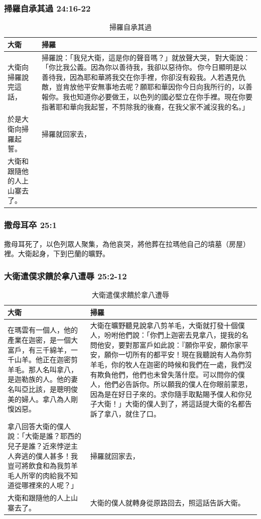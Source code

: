 \subsubsection{掃羅自承其過 24:16-22}
\begin{table}[H]
\hspace*{-5mm}
\centering
\begin{tabular}{p{4.75cm}|p{}}\hline\hline
大衛&掃羅\\\hline
大衛向掃羅說完這話，&掃羅說：「我兒大衛，這是你的聲音嗎？」就放聲大哭， 對大衛說：「你比我公義。因為你以善待我，我卻以惡待你。 你今日顯明是以善待我，因為耶和華將我交在你手裡，你卻沒有殺我。人若遇見仇敵，豈肯放他平安無事地去呢？願耶和華因你今日向我所行的，以善報你。我也知道你必要做王，以色列的國必堅立在你手裡。現在你要指著耶和華向我起誓，不剪除我的後裔，在我父家不滅沒我的名。」 \\\hline
於是大衛向掃羅起誓。&掃羅就回家去，\\\hline
大衛和跟隨他的人上山寨去了。&\\\hline
\end{tabular}
\caption{掃羅自承其過}
\end{table}

\subsubsection{撒母耳卒 25:1}
撒母耳死了，以色列眾人聚集，為他哀哭，將他葬在拉瑪他自己的墳墓（房屋）裡。大衛起身，下到巴蘭的曠野。

\subsubsection{大衛遣僕求饋於拿八遭辱 25:2-12}
\begin{table}[H]
\hspace*{-5mm}
\centering
\begin{tabular}{p{}|p{12.5cm}}\hline\hline
大衛&掃羅\\\hline
在瑪雲有一個人，他的產業在迦密，是一個大富戶，有三千綿羊，一千山羊。他正在迦密剪羊毛。那人名叫拿八，是迦勒族的人。他的妻名叫亞比該，是聰明俊美的婦人。拿八為人剛愎凶惡。&大衛在曠野聽見說拿八剪羊毛，大衛就打發十個僕人，吩咐他們說：「你們上迦密去見拿八，提我的名問他安，要對那富戶如此說：『願你平安，願你家平安，願你一切所有的都平安！現在我聽說有人為你剪羊毛，你的牧人在迦密的時候和我們在一處，我們沒有欺負他們，他們也未曾失落什麼。可以問你的僕人，他們必告訴你。所以願我的僕人在你眼前蒙恩，因為是在好日子來的。求你隨手取點賜予僕人和你兒子大衛！」大衛的僕人到了，將這話提大衛的名都告訴了拿八，就住了口。\\\hline
拿八回答大衛的僕人說：「大衛是誰？耶西的兒子是誰？近來悖逆主人奔逃的僕人甚多！我豈可將飲食和為我剪羊毛人所宰的肉給我不知道從哪裡來的人呢？」 &掃羅就回家去，\\\hline
大衛和跟隨他的人上山寨去了。&大衛的僕人就轉身從原路回去，照這話告訴大衛。\\\hline
\end{tabular}
\caption{大衛遣僕求饋於拿八遭辱}
\end{table}

